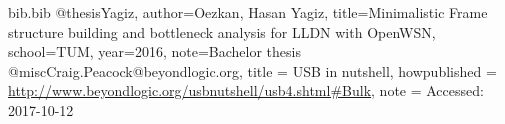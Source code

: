 \documentclass[12pt,a4paper]{report}
\begin{document}




\appendix





\begin{filecontents*}{bib.bib}
	@thesis{Yagiz,
		author={Oezkan, Hasan Yagiz},
		title={Minimalistic Frame structure building and bottleneck analysis for LLDN with OpenWSN},
		school={TUM},
		year={2016},
		note={Bachelor thesis}
	}
	@misc{Craig.Peacock@beyondlogic.org,
		title = {USB in nutshell},
		howpublished = {\url{http://www.beyondlogic.org/usbnutshell/usb4.shtml#Bulk}},
		note = {Accessed: 2017-10-12}
	}
\end{filecontents*}









\end{document}
